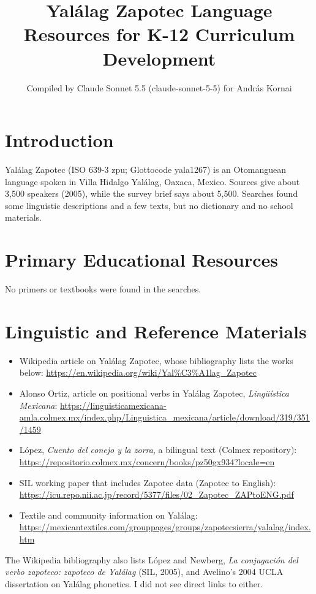 \documentclass[12pt]{article}
\title{Yal\'alag Zapotec Language Resources for K-12 Curriculum Development}
\author{Compiled by Claude Sonnet 5.5 (claude-sonnet-5-5) for Andr\'as Kornai}
\date{}
\begin{document}
\maketitle

\section{Introduction}
Yal\'alag Zapotec (ISO 639-3 zpu; Glottocode yala1267) is an Otomanguean language spoken in Villa Hidalgo Yal\'alag, Oaxaca, Mexico. Sources give about 3,500 speakers (2005), while the survey brief says about 5,500. Searches found some linguistic descriptions and a few texts, but no dictionary and no school materials.

\section{Primary Educational Resources}
No primers or textbooks were found in the searches.

\section{Linguistic and Reference Materials}
\begin{itemize}
\item Wikipedia article on Yal\'alag Zapotec, whose bibliography lists the works below: \url{https://en.wikipedia.org/wiki/Yal%C3%A1lag_Zapotec}
\item Alonso Ortiz, article on positional verbs in Yal\'alag Zapotec, \emph{Ling\"u\'istica Mexicana}: \url{https://linguisticamexicana-amla.colmex.mx/index.php/Linguistica_mexicana/article/download/319/351/1459}
\item L\'opez, \emph{Cuento del conejo y la zorra}, a bilingual text (Colmex repository): \url{https://repositorio.colmex.mx/concern/books/pz50gx934?locale=en}
\item SIL working paper that includes Zapotec data (Zapotec to English): \url{https://icu.repo.nii.ac.jp/record/5377/files/02_Zapotec_ZAPtoENG.pdf}
\item Textile and community information on Yal\'alag: \url{https://mexicantextiles.com/grouppages/groups/zapotecsierra/yalalag/index.htm}
\end{itemize}
The Wikipedia bibliography also lists L\'opez and Newberg, \emph{La conjugaci\'on del verbo zapoteco: zapoteco de Yal\'alag} (SIL, 2005), and Avelino's 2004 UCLA dissertation on Yal\'alag phonetics. I did not see direct links to either.
\end{document}
